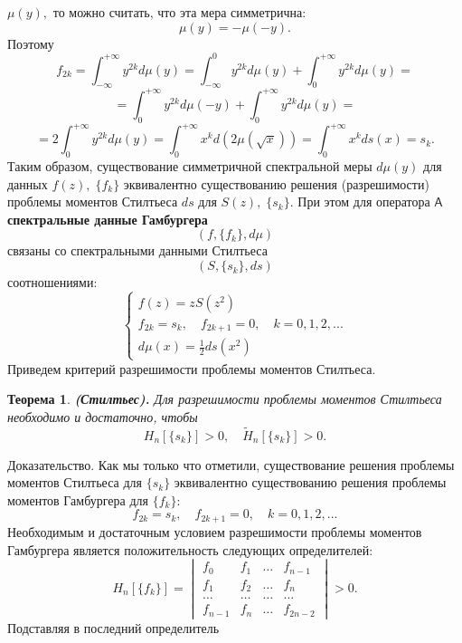 \documentclass[12 pt, a4 paper]{article}
\theoremstyle{plain}   \newtheorem{Pro}{Задача}
\newtheorem{The}{Теорема}
\begin{document}
$ \mu (y) , $
то можно считать, что эта мера симметрична:
$$
  \mu (y)=-\mu (-y).
$$
Поэтому
$$
  f_{2k}=\int _{-\infty}^{+\infty}y^{2k}d\mu (y)=
    \int _{-\infty}^0 y^{2k}d\mu (y) +
	  \int _0 ^{+\infty} y^{2k}d\mu (y)=
$$
$$
  =\int _0 ^{+\infty}y^{2k}d\mu (-y) +
    \int _0 ^{+\infty} y^{2k}d\mu (y)=
$$
$$
  =2\int _0 ^{+\infty}y^{2k}d\mu (y) =
    \int _0 ^{+\infty}x^k d(2\mu (\sqrt{x}))=
	  \int _0 ^{+\infty}x^k ds(x)=s_k .
$$
Таким образом, существование симметричной спектральной меры
$ d\mu (y) $
для данных
$ f(z), \; \{ f_k \} $
эквивалентно существованию решения (разрешимости)
проблемы моментов Стилтьеса
$ ds $
для
$ S(z), \; \{ s_k \} . $
При этом для оператора
$ \mathsf{A} $
{\bfseries спектральные данные Гамбургера}
$$
  (f, \{ f_k \} , d\mu )
$$
связаны со спектральными данными Стилтьеса  	  		
$$
  (S,\{ s_k \} , ds)
$$
соотношениями:
\begin{equation*}
  \begin{cases}
    f(z)=zS(z^2 ) \\
	f_{2k}=s_k , \quad f_{2k+1}=0 , \quad k=0,1,2,... \\
	d\mu (x)=\frac{1}{2}ds(x^2 )
  \end{cases}
\end{equation*}
Приведем критерий разрешимости проблемы моментов Стилтьеса.
\begin{The}{\bfseries (Стилтьес).}
Для разрешимости проблемы моментов Стилтьеса
необходимо и достаточно, чтобы
$$
  H_n [\{ s_k \} ]>0, \quad
  \tilde H_n [ \{ s_k \} ] > 0.
$$
\end{The}
{\Large Доказательство.}
Как мы только что отметили, существование решения
проблемы моментов Стилтьеса для
$ \{ s_k \} $
эквивалентно существованию решения проблемы моментов
Гамбургера для
$ \{ f_k \} : $
$$
  f_{2k}=s_k , \quad f_{2k+1}=0, \quad k=0,1,2,...
$$
Необходимым и достаточным условием разрешимости проблемы
моментов Гамбургера является положительность следующих
определителей:
\begin{equation*}
  H_n [\{ f_k \} ]=
    \begin{vmatrix}
	  f_0 & f_1 & \dots & f_{n-1} \\
	  f_1 & f_2 & \dots & f_n \\
	  \dots & \dots & \dots & \dots \\
	  f_{n-1} & f_n & \dots & f_{2n-2}
	\end{vmatrix}
  >0.
\end{equation*}
Подставляя в последний определитель
\end{document}
